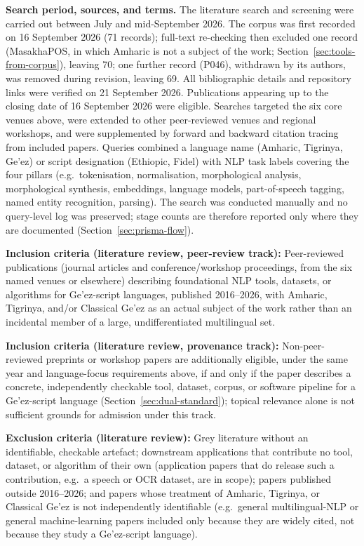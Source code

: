 \documentclass[sn-mathphys-num]{sn-jnl}
\theoremstyle{thmstyleone}
\theoremstyle{thmstyletwo}
\theoremstyle{thmstylethree}
\begin{document}
\textbf{Search period, sources, and terms.} The literature search and screening were carried out between July and mid-September 2026. The corpus was first recorded on 16 September 2026 (71 records); full-text re-checking then excluded one record (MasakhaPOS, in which Amharic is not a subject of the work; Section~\ref{sec:tools-from-corpus}), leaving 70; one further record (P046), withdrawn by its authors, was removed during revision, leaving 69. All bibliographic details and repository links were verified on 21 September 2026. Publications appearing up to the closing date of 16 September 2026 were eligible. Searches targeted the six core venues above, were extended to other peer-reviewed venues and regional workshops, and were supplemented by forward and backward citation tracing from included papers. Queries combined a language name (Amharic, Tigrinya, Ge'ez) or script designation (Ethiopic, Fidel) with NLP task labels covering the four pillars (e.g.\ tokenisation, normalisation, morphological analysis, morphological synthesis, embeddings, language models, part-of-speech tagging, named entity recognition, parsing). The search was conducted manually and no query-level log was preserved; stage counts are therefore reported only where they are documented (Section~\ref{sec:prisma-flow}).

\textbf{Inclusion criteria (literature review, peer-review track):} Peer-reviewed publications (journal articles and conference/workshop proceedings, from the six named venues or elsewhere) describing foundational NLP tools, datasets, or algorithms for Ge'ez-script languages, published 2016--2026, with Amharic, Tigrinya, and/or Classical Ge'ez as an actual subject of the work rather than an incidental member of a large, undifferentiated multilingual set.

\textbf{Inclusion criteria (literature review, provenance track):} Non-peer-reviewed preprints or workshop papers are additionally eligible, under the same year and language-focus requirements above, if and only if the paper describes a concrete, independently checkable tool, dataset, corpus, or software pipeline for a Ge'ez-script language (Section~\ref{sec:dual-standard}); topical relevance alone is not sufficient grounds for admission under this track.

\textbf{Exclusion criteria (literature review):} Grey literature without an identifiable, checkable artefact; downstream applications that contribute no tool, dataset, or algorithm of their own (application papers that do release such a contribution, e.g.\ a speech or OCR dataset, are in scope); papers published outside 2016--2026; and papers whose treatment of Amharic, Tigrinya, or Classical Ge'ez is not independently identifiable (e.g.\ general multilingual-NLP or general machine-learning papers included only because they are widely cited, not because they study a Ge'ez-script language).
\end{document}
